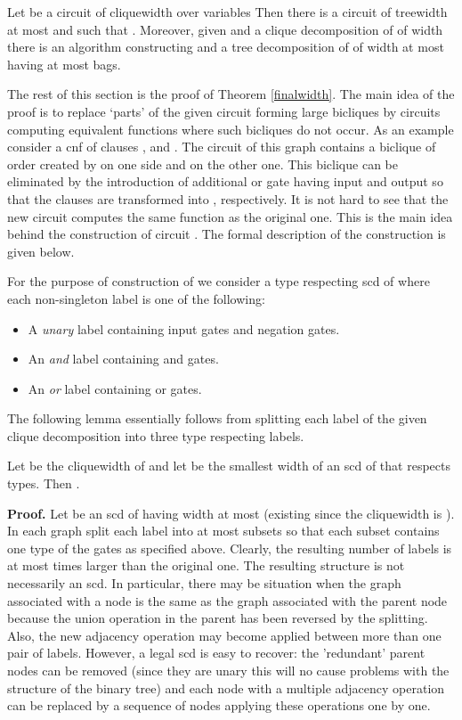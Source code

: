 \documentclass{llncs}
\begin{document}
\begin{theorem} \label{finalwidth}
Let  be a circuit of cliquewidth  over  variables
Then there is a circuit  of treewidth at most  and 
such that . Moreover, 
given  and a clique decomposition of  of width  there is
an  algorithm constructing  and a tree decomposition of
 of width at most  having at most  bags.
\end{theorem}

The rest of this section is the proof of Theorem \ref{finalwidth}.
The main idea of the proof is to replace `parts' of the given circuit forming large
bicliques by circuits computing equivalent functions where such bicliques do not occur.
As an example consider a {\sc cnf} of  clauses ,
 and . The circuit of this graph contains a biclique of order  created by 
on one side and  on the other one. This biclique can be eliminated 
by the introduction of additional {\sc or} gate  having input  and output  so that the clauses  are transformed into , 
respectively. It is not hard to see that the new circuit computes the same function as the original 
one. This is the main idea behind the construction of circuit . The formal description
of the construction is given below.


For the purpose of construction of 
we consider a type respecting {\sc scd}  of  where each non-singleton label is one of the following:
\begin{itemize}
\item A \emph{unary} label containing input gates and negation gates.
\item An \emph{{\sc and}} label containing {\sc and} gates.
\item An \emph{{\sc or}} label containing {\sc or} gates.
\end{itemize}
 
The following lemma essentially follows from splitting each label of the given clique decomposition into
three type respecting labels. 

\begin{lemma} \label{typerespect}
Let  be the cliquewidth of  and let  be the smallest width of an {\sc scd} of 
that respects types. Then .
\end{lemma}

{\bf Proof.}
Let  be an {\sc scd} of  having width at most  (existing since
the cliquewidth is ).
In each graph  split each label into at most  subsets so that
each subset contains one type of the gates as specified above. Clearly, the resulting
number of labels is at most  times larger than the original one. The resulting
structure is not necessarily an {\sc scd}. In particular, there may
be situation when the graph associated with a node is the same as the graph associated 
with the parent node because the union operation in the parent has been reversed by
the splitting. Also, the new adjacency operation may become applied between more than
one pair of labels. However, a legal {\sc scd} is easy to recover:
the 'redundant' parent nodes can be removed (since they are unary this will no
cause problems with the structure of the binary tree) and each node with
a multiple adjacency operation can be replaced by a sequence of nodes applying these
operations one by one. 
\end{document}
